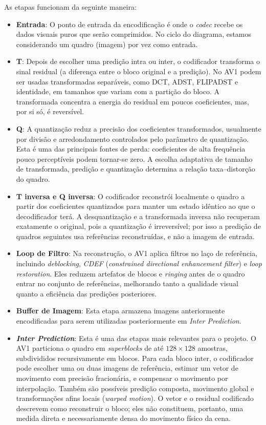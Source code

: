 \documentclass[a4paper,titlepage]{article}
\begin{document}
As etapas funcionam da seguinte maneira:
\begin{itemize}
    \item \textbf{Entrada}: O ponto de entrada da encodificação é onde o \emph{codec} recebe os dados visuais puros que serão comprimidos. No ciclo do diagrama, estamos considerando um quadro (imagem) por vez como entrada.
    \item \textbf{T}: Depois de escolher uma predição intra ou inter, o codificador transforma o sinal residual (a diferença entre o bloco original e a predição). No AV1 podem ser usadas transformadas separáveis, como DCT, ADST, FLIPADST e identidade, em tamanhos que variam com a partição do bloco. A transformada concentra a energia do residual em poucos coeficientes, mas, por si só, é reversível.
    \item \textbf{Q}: A quantização reduz a precisão dos coeficientes transformados, usualmente por divisão e arredondamento controlados pelo parâmetro de quantização. Esta é uma das principais fontes de perda: coeficientes de alta frequência pouco perceptíveis podem tornar-se zero. A escolha adaptativa de tamanho de transformada, predição e quantização determina a relação taxa--distorção do quadro.
    \item \textbf{T inversa e Q inversa}: O codificador reconstrói localmente o quadro a partir dos coeficientes quantizados para manter um estado idêntico ao que o decodificador terá. A desquantização e a transformada inversa não recuperam exatamente o original, pois a quantização é irreversível; por isso a predição de quadros seguintes usa referências reconstruídas, e não a imagem de entrada.
    \item \textbf{Loop de Filtro}: Na reconstrução, o AV1 aplica filtros no laço de referência, incluindo \emph{deblocking}, \emph{CDEF} (\emph{constrained directional enhancement filter}) e \emph{loop restoration}. Eles reduzem artefatos de blocos e \emph{ringing} antes de o quadro entrar no conjunto de referências, melhorando tanto a qualidade visual quanto a eficiência das predições posteriores.
    \item \textbf{Buffer de Imagem}: Esta etapa armazena imagens anteriormente encodificadas para serem utilizadas posteriormente em \emph{Inter Prediction}.
    \item \textbf{\emph{Inter Prediction}}: Esta é uma das etapas mais relevantes para o projeto. O AV1 particiona o quadro em \emph{superblocks} de até $128\times128$ amostras, subdivididos recursivamente em blocos. Para cada bloco inter, o codificador pode escolher uma ou duas imagens de referência, estimar um vetor de movimento com precisão fracionária, e compensar o movimento por interpolação. Também são possíveis predição composta, movimento global e transformações afins locais (\emph{warped motion}). O vetor e o residual codificado descrevem como reconstruir o bloco; eles não constituem, portanto, uma medida direta e necessariamente densa do movimento físico da cena.

\end{itemize}
\end{document}
